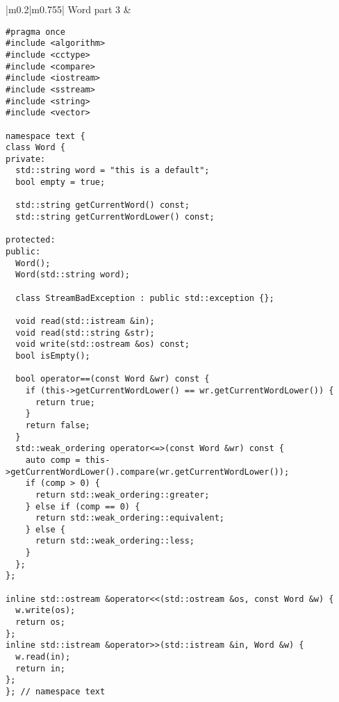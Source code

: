 \documentclass[main.tex,fontsize=8pt,paper=a4,paper=portrait,DIV=calc]{scrartcl}
\begin{document}
\begin{table}[ht!]
\begin{tabular}{|m{0.2\linewidth}|m{0.755\linewidth}|}
\hline
Word part 3 & 
\vspace{2mm}
\begin{lstlisting}
#pragma once
#include <algorithm>
#include <cctype>
#include <compare>
#include <iostream>
#include <sstream>
#include <string>
#include <vector>

namespace text {
class Word {
private:
  std::string word = "this is a default";
  bool empty = true;

  std::string getCurrentWord() const;
  std::string getCurrentWordLower() const;

protected:
public:
  Word();
  Word(std::string word);

  class StreamBadException : public std::exception {};

  void read(std::istream &in);
  void read(std::string &str);
  void write(std::ostream &os) const;
  bool isEmpty();

  bool operator==(const Word &wr) const {
    if (this->getCurrentWordLower() == wr.getCurrentWordLower()) {
      return true;
    }
    return false;
  }
  std::weak_ordering operator<=>(const Word &wr) const {
    auto comp = this->getCurrentWordLower().compare(wr.getCurrentWordLower());
    if (comp > 0) {
      return std::weak_ordering::greater;
    } else if (comp == 0) {
      return std::weak_ordering::equivalent;
    } else {
      return std::weak_ordering::less;
    }
  };
};

inline std::ostream &operator<<(std::ostream &os, const Word &w) {
  w.write(os);
  return os;
};
inline std::istream &operator>>(std::istream &in, Word &w) {
  w.read(in);
  return in;
};
}; // namespace text
\end{lstlisting}
\\
\hline
\end{tabular}
\end{table}
\pagebreak
\end{document}
